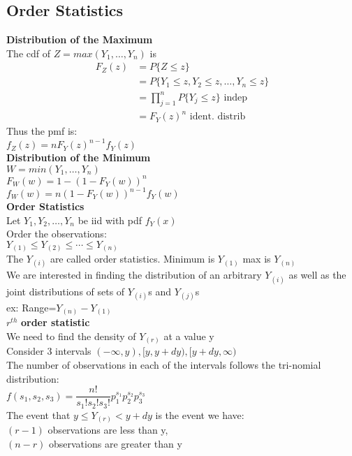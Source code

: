 \documentclass{article}
\begin{document}
\begin{flushleft}
\subsection*{Order Statistics}
\textbf{Distribution of the Maximum}\\
The cdf of $Z=max(Y_1,\dots,Y_n)$ is\\
\begin{align*}
F_Z(z)&= P\{Z\leq z \}\\
&=P\{Y_1\leq z, Y_2 \leq z,\dots, Y_n \leq z \}\\
&=\prod_{j=1}^{n}P\{Y_j\leq z \} \text{ indep}\\
&=F_Y(z)^n \text{ ident. distrib}
\end{align*}
Thus the pmf is:\\
$f_Z(z)=nF_Y(z)^{n-1}f_Y(z)$\\
\textbf{Distribution of the Minimum}\\
$W=min(Y_1,\dots,Y_n)$\\
$F_W(w)=1-(1-F_Y(w))^n$\\
$f_W(w)=n(1-F_Y(w))^{n-1}f_Y(w)$\\
\textbf{Order Statistics}\\
Let $Y_1,Y_2,\dots, Y_n$ be iid with pdf $f_Y(x)$\\
Order the observations:\\
$Y_{(1)}\leq Y_{(2)}\leq \cdots \leq Y_{(n)}$\\
The $Y_{(i)}$ are called order statistics. Minimum is $Y_{(1)}$ max is $Y_{(n)}$\\
We are interested in finding the distribution of an arbitrary $Y_{(i)}$ as well as the joint distributions of sets of $Y_{(i)}$s and $Y_{(j)}$s\\
ex: Range=$Y_{(n)}-Y_{(1)}$\\
$r^{th}$\textbf{ order statistic}\\
We need to find the density of $Y_{(r)}$ at a value y\\
Consider 3 intervals $(-\infty,y),[y,y+dy),[y+dy,\infty)$\\
The number of observations in each of the intervals follows the tri-nomial distribution:\\
$f(s_1,s_2,s_3)=\dfrac{n!}{s_1!s_2!s_3!}p_1^{s_1}p_2^{s_2}p_3^{s_3}$\\
The event that $y\leq Y_{(r)}<y+dy$ is the event we have:\\
$(r-1)$ observations are less than y,\\
$(n-r)$ observations are greater than y\\

\end{flushleft}
\end{document}
